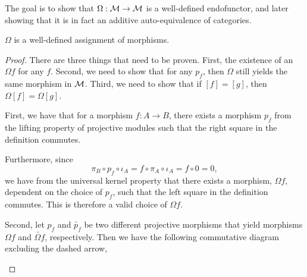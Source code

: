 The goal is to show that \( \Omega: {\mathcal{M}} \to {\mathcal{M}} \) is a well-defined endofunctor, and later showing that it is in fact an additive auto-equivalence of categories.

\begin{lemma}
    \label{lem:stmod_omega_f_is_well_defined}
    \( \Omega \) is a well-defined assignment of morphisms.
\end{lemma}
\begin{proof}
    There are three things that need to be proven. First, the existence of an \( \Omega f \) for any \( f \). Second, we need to show that for any \( p_f \), then \( \Omega \) still yields the same morphism in \( {\mathcal{M}} \). Third, we need to show that if \( [f] = [g] \), then \( \Omega [f] = \Omega [g] \).

    First, we have that for a morphism \( f: A \to B \), there exists a morphism \( p_f \) from the lifting property of projective modules such that the right square in the definition commutes.

    Furthermore, since
    \[
        \pi_B \circ p_f \circ \iota_A = f \circ \pi_A \circ \iota_A = f \circ 0 = 0,
    \]
    we have from the universal kernel property that there exists a morphism, \( \Omega f \), dependent on the choice of \( p_f \), such that the left square in the definition commutes. This is therefore a valid choice of \( \Omega f \).

    Second, let \( p_f \) and \( \widetilde{p_f} \) be two different projective morphisms that yield morphisms \( \Omega f \) and \( \widetilde{\Omega f} \), respectively. Then we have the following commutative diagram excluding the dashed arrow,
    \begin{center}
    \end{center}


\end{proof}
